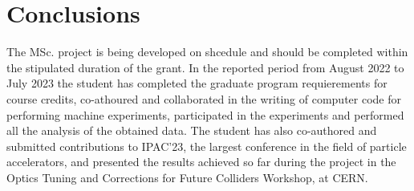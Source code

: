 


\section{Conclusions}
The MSc. project is being developed on shcedule and should be completed within the stipulated duration of the grant. In the reported period from August 2022 to July 2023 the student has completed the graduate program requierements for course credits, co-athoured and collaborated in the writing of computer code for performing machine experiments, participated in the experiments and performed all the analysis of the obtained data. The student has also co-authored and submitted contributions to IPAC'23, the largest conference in the field of particle accelerators, and presented the results achieved so far during the project in the Optics Tuning and Corrections for Future Colliders Workshop, at CERN.

